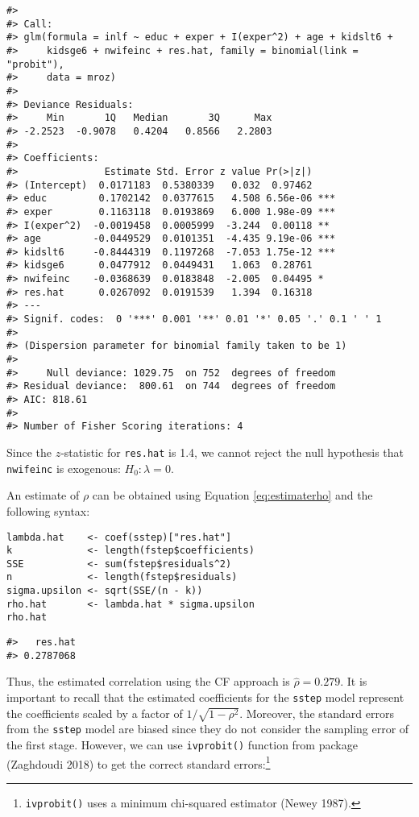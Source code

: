 \begin{verbatim}
#> 
#> Call:
#> glm(formula = inlf ~ educ + exper + I(exper^2) + age + kidslt6 + 
#>     kidsge6 + nwifeinc + res.hat, family = binomial(link = "probit"), 
#>     data = mroz)
#> 
#> Deviance Residuals: 
#>     Min       1Q   Median       3Q      Max  
#> -2.2523  -0.9078   0.4204   0.8566   2.2803  
#> 
#> Coefficients:
#>               Estimate Std. Error z value Pr(>|z|)    
#> (Intercept)  0.0171183  0.5380339   0.032  0.97462    
#> educ         0.1702142  0.0377615   4.508 6.56e-06 ***
#> exper        0.1163118  0.0193869   6.000 1.98e-09 ***
#> I(exper^2)  -0.0019458  0.0005999  -3.244  0.00118 ** 
#> age         -0.0449529  0.0101351  -4.435 9.19e-06 ***
#> kidslt6     -0.8444319  0.1197268  -7.053 1.75e-12 ***
#> kidsge6      0.0477912  0.0449431   1.063  0.28761    
#> nwifeinc    -0.0368639  0.0183848  -2.005  0.04495 *  
#> res.hat      0.0267092  0.0191539   1.394  0.16318    
#> ---
#> Signif. codes:  0 '***' 0.001 '**' 0.01 '*' 0.05 '.' 0.1 ' ' 1
#> 
#> (Dispersion parameter for binomial family taken to be 1)
#> 
#>     Null deviance: 1029.75  on 752  degrees of freedom
#> Residual deviance:  800.61  on 744  degrees of freedom
#> AIC: 818.61
#> 
#> Number of Fisher Scoring iterations: 4
\end{verbatim}

Since the \(z\)-statistic for \texttt{res.hat} is 1.4, we cannot reject the null hypothesis that \texttt{nwifeinc} is exogenous: \(H_0:\lambda = 0\).

An estimate of \(\rho\) can be obtained using Equation \eqref{eq:estimaterho} and the following syntax:

\begin{verbatim}
lambda.hat    <- coef(sstep)["res.hat"]
k             <- length(fstep$coefficients)
SSE           <- sum(fstep$residuals^2)
n             <- length(fstep$residuals)
sigma.upsilon <- sqrt(SSE/(n - k))
rho.hat       <- lambda.hat * sigma.upsilon
rho.hat
\end{verbatim}

\begin{verbatim}
#>   res.hat 
#> 0.2787068
\end{verbatim}

Thus, the estimated correlation using the CF approach is \(\widehat{\rho} = 0.279\). It is important to recall that the estimated coefficients for the \texttt{sstep} model represent the coefficients scaled by a factor of \(1 / \sqrt{1 - \rho^2}\). Moreover, the standard errors from the \texttt{sstep} model are biased since they do not consider the sampling error of the first stage. However, we can use \texttt{ivprobit()} function from  package (Zaghdoudi 2018) to get the correct standard errors:\footnote{\texttt{ivprobit()} uses a minimum chi-squared estimator (Newey 1987).}


